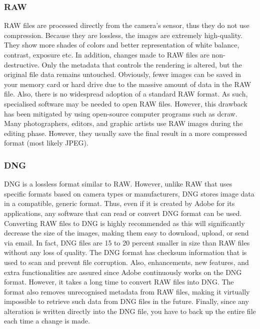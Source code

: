 \documentclass[10pt]{article}
\begin{document}
\begin{multicols}{2}
\subsubsection{RAW}
RAW files are processed directly from the camera's sensor, thus they do not use compression. Because they are lossless, the images are extremely high-quality. They show more shades of colors and better representation of white balance, contrast, exposure  etc. In addition, changes made to RAW files are non-destructive. Only the metadata that controls the rendering is altered, but the original file data remains untouched.
\newline \newline
Obviously, fewer images can be saved in your memory card or hard drive due to the massive amount of data in the RAW file. Also, there is no widespread adoption of a standard RAW format.
As such, specialised software may be needed to open RAW files. However, this drawback has been mitigated by using open-source computer programs such as dcraw.
\newline \newline
Many photographers, editors, and graphic artists use RAW images during the editing phase. However, they usually save the final result in a more compressed format (most likely JPEG).

\subsubsection{DNG}
DNG is a lossless format similar to RAW. However, unlike RAW that uses specific formats based on camera types or manufacturers, DNG stores image data in a compatible, generic format. Thus, even if it is created by Adobe for its applications, any software that can read or convert DNG format can be used.
\newline \newline
Converting RAW files to DNG is highly recommended as this will significantly decrease the size of the images, making them easy to download, upload, or send via email. In fact, DNG files are 15 to 20 percent smaller in size than RAW files without any loss of quality.
\newline \newline
The DNG format has checksum information that is used to scan and prevent file corruption. Also, enhancements, new features, and extra functionalities are assured since Adobe continuously works on the DNG format.
\newline \newline
However, it takes a long time to convert RAW files into DNG. The format also removes unrecognised metadata from RAW files, making it virtually impossible to retrieve such data from DNG files in the future. Finally, since any alteration is written directly into the DNG file, you have to back up the entire file each time a change is made.


\end{multicols}
\end{document}
